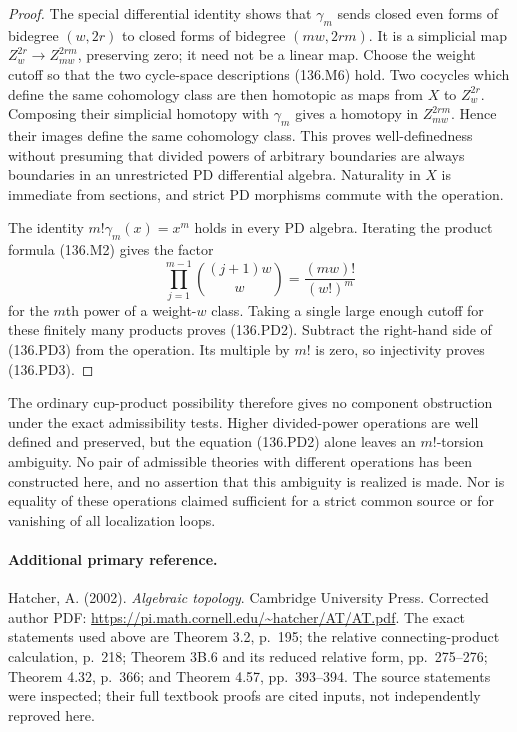 \begin{proof}
The special differential identity shows that
$\gamma_m$ sends closed even forms of bidegree
$(w,2r)$ to closed forms of bidegree $(mw,2rm)$.
It is a simplicial map
$Z^{2r}_w\to Z^{2rm}_{mw}$, preserving zero; it need
not be a linear map. Choose the weight cutoff so that
the two cycle-space descriptions (136.M6) hold.
Two cocycles which define the same cohomology class
are then homotopic as maps from $X$ to $Z^{2r}_w$.
Composing their simplicial homotopy with $\gamma_m$
gives a homotopy in $Z^{2rm}_{mw}$. Hence their
images define the same cohomology class. This proves
well-definedness without presuming that divided powers
of arbitrary boundaries are always boundaries in an
unrestricted PD differential algebra.
Naturality in $X$ is immediate from sections, and
strict PD morphisms commute with the operation.

The identity $m!\gamma_m(x)=x^m$ holds in every PD
algebra. Iterating the product formula (136.M2) gives
the factor
\[
 \prod_{j=1}^{m-1}\binom{(j+1)w}{w}
                          =\frac{(mw)!}{(w!)^m}
\]
for the $m$th power of a weight-$w$ class. Taking a
single large enough cutoff for these finitely many
products proves (136.PD2). Subtract the right-hand
side of (136.PD3) from the operation. Its multiple
by $m!$ is zero, so injectivity proves (136.PD3).
\end{proof}

The ordinary cup-product possibility therefore gives
no component obstruction under the exact admissibility
tests. Higher divided-power operations are well defined
and preserved, but the equation (136.PD2) alone leaves
an $m!$-torsion ambiguity. No pair of admissible theories
with different operations has been constructed here,
and no assertion that this ambiguity is realized is
made. Nor is equality of these operations claimed
sufficient for a strict common source or for vanishing
of all localization loops.

\paragraph{Additional primary reference.}
Hatcher, A. (2002). \emph{Algebraic topology}. Cambridge
University Press. Corrected author PDF:
\url{https://pi.math.cornell.edu/~hatcher/AT/AT.pdf}.
The exact statements used above are Theorem 3.2,
p.~195; the relative connecting-product calculation,
p.~218; Theorem 3B.6 and its reduced relative form,
pp.~275--276; Theorem 4.32, p.~366; and Theorem 4.57,
pp.~393--394. The source statements were inspected;
their full textbook proofs are cited inputs, not
independently reproved here.
